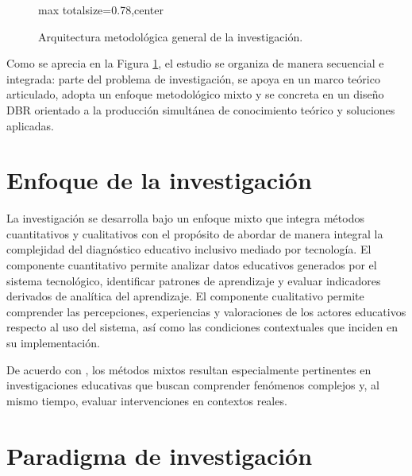\begin{refsection}
\begin{figure}[htbp]
\begin{adjustbox}{max totalsize={\textwidth}{0.78\textheight},center}
\end{adjustbox}
\caption{Arquitectura metodológica general de la investigación.}
\label{fig:arquitectura-metodologica}
\end{figure}
Como se aprecia en la Figura \ref{fig:arquitectura-metodologica}, el estudio se organiza de manera secuencial e integrada: parte del problema de investigación, se apoya en un marco teórico articulado, adopta un enfoque metodológico mixto y se concreta en un diseño DBR orientado a la producción simultánea de conocimiento teórico y soluciones aplicadas.

\section{Enfoque de la investigación}

La investigación se desarrolla bajo un enfoque mixto que integra métodos cuantitativos y cualitativos con el propósito de abordar de manera integral la complejidad del diagnóstico educativo inclusivo mediado por tecnología. El componente cuantitativo permite analizar datos educativos generados por el sistema tecnológico, identificar patrones de aprendizaje y evaluar indicadores derivados de analítica del aprendizaje. El componente cualitativo permite comprender las percepciones, experiencias y valoraciones de los actores educativos respecto al uso del sistema, así como las condiciones contextuales que inciden en su implementación.

De acuerdo con \textcite{creswell2018}, los métodos mixtos resultan especialmente pertinentes en investigaciones educativas que buscan comprender fenómenos complejos y, al mismo tiempo, evaluar intervenciones en contextos reales.

\section{Paradigma de investigación}


\end{refsection}
